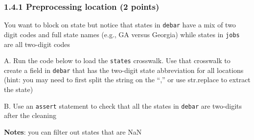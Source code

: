 \documentclass[11pt]{article}
\begin{document}
    \hypertarget{preprocessing-location-2-points}{%
\subsubsection{1.4.1 Preprocessing location (2
points)}\label{preprocessing-location-2-points}}

You want to block on state but notice that states in \texttt{debar} have
a mix of two digit codes and full state names (e.g., GA versus Georgia)
while states in \texttt{jobs} are all two-digit codes

A. Run the code below to load the \texttt{states} crosswalk. Use that
crosswalk to create a field in \texttt{debar} that has the two-digit
state abbreviation for all locations (hint: you may need to first split
the string on the ``,'' or use str.replace to extract the state)

B. Use an \texttt{assert} statement to check that all the states in
\texttt{debar} are two-digits after the cleaning

\textbf{Notes}: you can filter out states that are NaN
\end{document}

